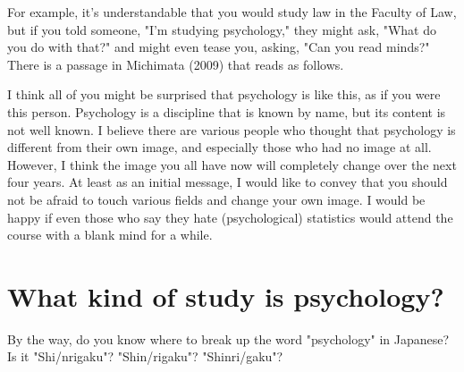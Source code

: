 \documentclass{ltjsbook}
\begin{document}
For example, it's understandable that you would study law in the Faculty of Law, but if you told someone, "I'm studying psychology," they might ask, "What do you do with that?" and might even tease you, asking, "Can you read minds?" There is a passage in Michimata (2009) that reads as follows.



I think all of you might be surprised that psychology is like this, as if you were this person. Psychology is a discipline that is known by name, but its content is not well known. I believe there are various people who thought that psychology is different from their own image, and especially those who had no image at all. However, I think the image you all have now will completely change over the next four years. At least as an initial message, I would like to convey that you should not be afraid to touch various fields and change your own image. I would be happy if even those who say they hate (psychological) statistics would attend the course with a blank mind for a while.

\section{What kind of study is psychology?}

By the way, do you know where to break up the word "psychology" in Japanese? Is it "Shi/nrigaku"? "Shin/rigaku"? "Shinri/gaku"?
\end{document}
